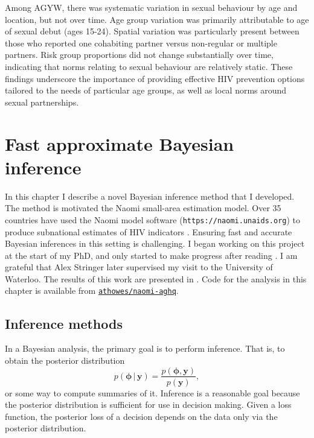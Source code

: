 \documentclass[a4paper, nobind]{templates/ociamthesis}
\begin{document}
Among AGYW, there was systematic variation in sexual behaviour by age and location, but not over time.
Age group variation was primarily attributable to age of sexual debut (ages 15-24).
Spatial variation was particularly present between those who reported one cohabiting partner versus non-regular or multiple partners.
Risk group proportions did not change substantially over time, indicating that norms relating to sexual behaviour are relatively static.
These findings underscore the importance of providing effective HIV prevention options tailored to the needs of particular age groups, as well as local norms around sexual partnerships.

\hypertarget{naomi-aghq}{%
\chapter{Fast approximate Bayesian inference}\label{naomi-aghq}}

\adjustmtc
{}

In this chapter I describe a novel Bayesian inference method that I developed.
The method is motivated the Naomi small-area estimation model.
Over 35 countries have used the Naomi model software (\texttt{https://naomi.unaids.org}) to produce subnational estimates of HIV indicators \autocite{unaids2023global}.
Ensuring fast and accurate Bayesian inferences in this setting is challenging.
I began working on this project at the start of my PhD, and only started to make progress after reading \textcite{stringer2021fast}.
I am grateful that Alex Stringer later supervised my visit to the University of Waterloo.
The results of this work are presented in \textcite{howes2023fast}.
Code for the analysis in this chapter is available from \href{https://github.com/athowes/elgm-inf}{\texttt{athowes/naomi-aghq}}.

\hypertarget{inference-methods}{%
\section{Inference methods}\label{inference-methods}}

In a Bayesian analysis, the primary goal is to perform inference.
That is, to obtain the posterior distribution
\begin{equation}
p(\boldsymbol{\mathbf{\phi}} \, | \, \mathbf{y}) = \frac{p(\boldsymbol{\mathbf{\phi}}, \mathbf{y})}{p(\mathbf{y})},
\end{equation}
or some way to compute summaries of it.
Inference is a reasonable goal because the posterior distribution is sufficient for use in decision making.
Given a loss function, the posterior loss of a decision depends on the data only via the posterior distribution.
\end{document}
